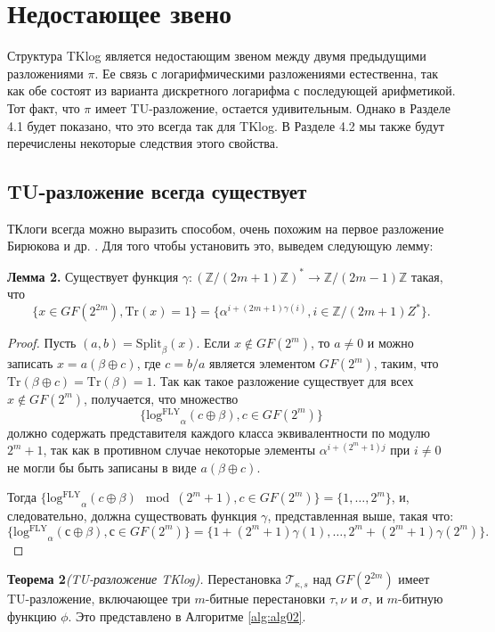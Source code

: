 \section{Недостающее звено}
Структура TKlog является недостающим звеном между двумя предыдущими разложениями \(\pi\). Ее связь с логарифмическими разложениями \cite{PU16} естественна, так как обе состоят из варианта дискретного логарифма с последующей арифметикой. Тот факт, что \(\pi\) имеет TU-разложение, остается удивительным. Однако в Разделе 4.1 будет показано, что это всегда так для TKlog. В Разделе 4.2 мы также будут перечислены некоторые следствия этого свойства.

\subsection{TU-разложение всегда существует}
ТКлоги всегда можно выразить способом, очень похожим на первое разложение Бирюкова и др. \cite{BPU16a}. Для того чтобы установить это, выведем следующую лемму:

\textbf{Лемма 2.} Существует функция \(\gamma : (\mathbb{Z}/(2m + 1)\mathbb{Z})^* \to \mathbb{Z}/(2m - 1)\mathbb{Z}\) такая, что 
\[
\{x \in GF(2^{2m}), \mathrm{Tr}(x) = 1\} = \{\alpha^{i + (2m+1)\gamma(i)}, i \in \mathbb{Z}/(2m + 1)Z^*\}.
\]

\begin{proof}
Пусть \((a, b) = \mathrm{Split}_{\beta}(x)\). Если \(x \notin GF(2^m)\), то \(a \neq 0\) и можно записать \(x = a(\beta \oplus c)\), где \(c = b/a\) является элементом \(GF(2^m)\), таким, что \(\mathrm{Tr}(\beta \oplus c) = \mathrm{Tr}(\beta) = 1\). Так как такое разложение существует для всех \(x \notin GF(2^m)\), получается, что множество 
\[
\{\mathrm{log^{FLY}}_{\alpha}(c \oplus \beta), c \in GF(2^m)\}
\]
должно содержать представителя каждого класса эквивалентности по модулю \(2^m + 1\), так как в противном случае некоторые элементы \(\alpha^{i + (2^m+1)j}\) при \(i \neq 0\) не могли бы быть записаны в виде \(a(\beta \oplus c)\).

Тогда \(\{\mathrm{log^{FLY}}_{\alpha}(c \oplus \beta) \mod (2^m + 1), c \in GF(2^m)\} = \{1, \ldots, 2^m\}\),
и, следовательно, должна существовать функция \(\gamma\), представленная выше, такая что:
\[
\{\mathrm{log^{FLY}}_{\alpha}(с \oplus \beta), с \in GF(2^m)\} = \{1 + (2^m + 1)\gamma(1), \ldots, 2^m + (2^m + 1)\gamma(2^m)\}.
\]
\end{proof}

\textbf{Теорема 2}\textit{(TU-разложение TKlog).}
Перестановка \(\mathscr{T}_{\kappa, s}\) над \(GF(2^{2m})\) имеет TU-разложение, включающее три \(m\)-битные перестановки \(\tau, \nu\) и \(\sigma\), и \(m\)-битную функцию \(\phi\). Это представлено в Алгоритме \ref{alg:alg02}.

